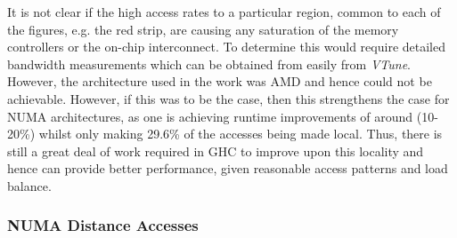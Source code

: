 \documentclass{paper}\usepackage{graphicx}
\begin{document}

It is not clear if the high access rates to a particular region, common to each of the figures, e.g. the red strip, are causing any saturation of the memory controllers or the on-chip interconnect. To determine this would require detailed bandwidth measurements which can be obtained from easily from \textit{VTune}. However, the architecture used in the work was AMD and hence could not be achievable. However, if this was to be the case, then this strengthens the case for NUMA architectures, as one is achieving runtime improvements of around (10-20\%) whilst only making 29.6\% of the accesses being made local. Thus, there is still a great deal of work required in GHC to improve upon this locality and hence can provide better performance, given reasonable access patterns and load balance.

\subsubsection{NUMA Distance Accesses}
\label{sec:numa_distance_accesses}

\end{document}
